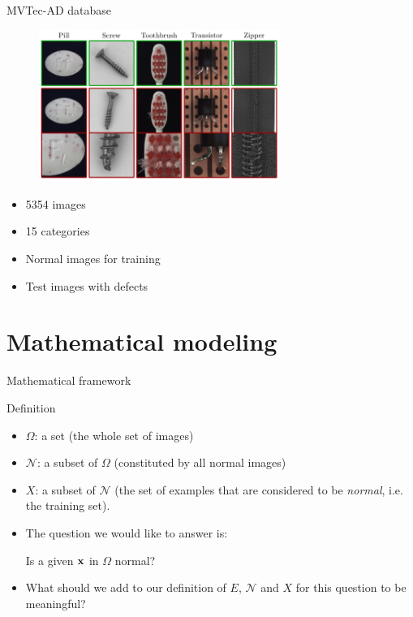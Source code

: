 \documentclass[xcolor=pdftex,dvipsnames,table,mathserif]{beamer}
\begin{document}
\begin{frame}{MVTec-AD database \cite{bergmann_mvtec_2019}}

\begin{figure}[ht]
  \centering
  \includegraphics[width=0.7\textwidth]{mvtec_ad}
\end{figure}

\begin{itemize}
\item 5354 images
\item 15 categories
\item Normal images for training
\item Test images with defects
\end{itemize}

\end{frame}



\section{Mathematical modeling}

\begin{frame}{Mathematical framework}

  \begin{block}{Definition}
\begin{itemize}
  \item $\Omega$: a set (the whole set of images)
  \item $\mathcal{N}$: a subset of $\Omega$ (constituted by all normal images)
  \item $X$: a subset of $\mathcal{N}$ (the set of examples that are considered to be \emph{normal}, i.e. the \alert{training set}).
\end{itemize}
  \end{block}

  \begin{itemize}
  \item The question we would like to answer is:

    \begin{block}{}
      \centering
      Is a given $\mathbf{x}$ in $\Omega$ normal?
    \end{block}

  \item What should we add to our definition of $E$, $\mathcal{N}$ and $X$ for this question to be meaningful?
  \end{itemize}


\end{frame}
\end{document}
